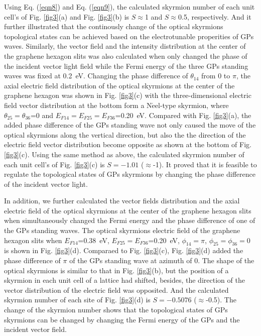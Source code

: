 \documentclass{optica-article}
\begin{document}
Using Eq. (\ref{eqn8}) and Eq. (\ref{eqn9}), the calculated skyrmion number of each unit cell's of Fig. \ref{fig3}(a) and Fig. \ref{fig3}(b) is $S\approx$1 and $S\approx$0.5, respectively. And it further illustrated that the continously change of the optical skyrmions topological states can be achieved based on the electrotunable properities of GPs waves. Similarly, the vector field and the intensity distribution at the center of the graphene hexagon slits was also calculated when only changed the phase of the incident vector light field while the Fermi energy of the three GPs standing waves was fixed at 0.2~eV. Changing the phase difference of $\theta_{14}$ from 0 to $\pi$, the axial electric field distribution of the optical skyrmions at the center of the graphene hexagon was shown in Fig. \ref{fig3}(c) with the three-dimensional electric field vector distribution at the bottom form a N$\acute{\text{e}}$el-type skyrmion, where $\theta_{25}=\theta_{36}$=0 and $E_{F14}=E_{F25}=E_{F36}$=0.20~eV. Compared with Fig. \ref{fig3}(a), the added phase difference of the GPs standing wave not only caused the move of the optical skyrmions along the vertical direction, but also the the direction of the electric field vector distribution become opposite as shown at the bottom of Fig. \ref{fig3}(c). Using the same method as above, the calculated skyrmion number of each unit cell's of Fig. \ref{fig3}(c) is $S=-1.01$ ($\approx$-1). It proved that it is feasible to regulate the topological states of GPs skyrmions by changing the phase difference of the incident vector light.

In addition, we further calculated the vector fields distribution and the axial electric field of the optical skyrmions at the center of the graphene hexagon slits when simultaneously changed the Fermi energy and the phase difference of one of the GPs standing waves. The optical skyrmions electric field of the graphene hexagon slits when $E_{F14}$=0.38~eV, $E_{F25}=E_{F36}$=0.20~eV, $\phi_{14}=\pi$, $\phi_{25}=\phi_{36}=0$ is shown in Fig. \ref{fig3}(d). Comparaed to Fig. \ref{fig3}(c), Fig. \ref{fig3}(d) added the phase difference of $\pi$ of the GPs standing wave at azimuth of 0. The shape of the optical skyrmions is similar to that in Fig. \ref{fig3}(b), but the position of a skyrmion in each unit cell of a lattice had shifted, besides, the direction of the vector distribution of the electric field was opposited. And the calculated skyrmion number of each site of Fig. \ref{fig3}(d) is $S=-0.5076$ ($\approx$-0.5). The change of the skyrmion number shows that the topological states of GPs skyrmions can be changed by changing the Fermi energy of the GPs and the incident vector field.
\end{document}
